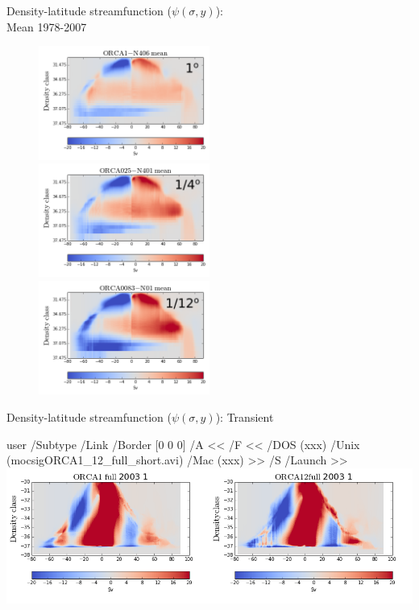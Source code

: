 \documentclass{beamer}
\newcommand{\LaunchBinary}[2]{%
  \leavevmode%
  \pdfstartlink user {
    /Subtype /Link
    /Border [0 0 0]%
    /A <<
      /F <<
         /DOS (xxx)
         /Unix (#1)
         /Mac (xxx)
      >>
      /S /Launch
    >>
  }#2%
  \pdfendlink%
}
\begin{document}
\begin{frame}{Density-latitude streamfunction ($\psi(\sigma, y)$):\\Mean 1978-2007}
\vspace{-0.4cm}
\begin{figure}[H]
\centering
\includegraphics[width=0.5\textwidth]{mocsigORCA1_fullMeanStreatchedP.png}
\includegraphics[width=0.5\textwidth]{mocsigORCA025_fullMeanStreatchedP.png}\\
\vspace{-0.2cm}
\includegraphics[width=0.5\textwidth]{mocsigORCA12_fullMeanStreatchedP.png}

\end{figure}
\end{frame}

\begin{frame}{Density-latitude streamfunction ($\psi(\sigma, y)$): Transient}
\begin{center}
\LaunchBinary{mocsigORCA1_12_full_short.avi}{\includegraphics[width=1\textwidth]{mergedmocsigORCA12_full_300.png}}%
\end{center}
\end{frame}
\end{document}
